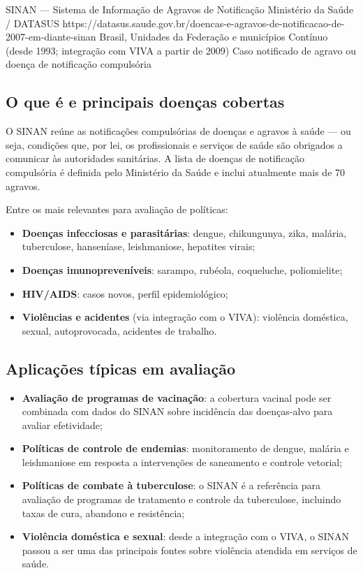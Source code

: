 \ficharapida
  {SINAN --- Sistema de Informação de Agravos de Notificação}
  {Ministério da Saúde / DATASUS}
  {https://datasus.saude.gov.br/doencas-e-agravos-de-notificacao-de-2007-em-diante-sinan}
  {Brasil, Unidades da Federação e municípios}
  {Contínuo (desde 1993; integração com VIVA a partir de 2009)}
  {Caso notificado de agravo ou doença de notificação compulsória}

\subsection{O que é e principais doenças cobertas}

O SINAN reúne as notificações compulsórias de doenças e agravos à saúde --- ou seja, condições que, por lei, os profissionais e serviços de saúde são obrigados a comunicar às autoridades sanitárias. A lista de doenças de notificação compulsória é definida pelo Ministério da Saúde e inclui atualmente mais de 70 agravos.

Entre os mais relevantes para avaliação de políticas:

\begin{itemize}
  \item \textbf{Doenças infecciosas e parasitárias}: dengue, chikungunya, zika, malária, tuberculose, hanseníase, leishmaniose, hepatites virais;
  \item \textbf{Doenças imunopreveníveis}: sarampo, rubéola, coqueluche, poliomielite;
  \item \textbf{HIV/AIDS}: casos novos, perfil epidemiológico;
  \item \textbf{Violências e acidentes} (via integração com o VIVA): violência doméstica, sexual, autoprovocada, acidentes de trabalho.
\end{itemize}

\subsection{Aplicações típicas em avaliação}

\begin{itemize}
  \item \textbf{Avaliação de programas de vacinação}: a cobertura vacinal pode ser combinada com dados do SINAN sobre incidência das doenças-alvo para avaliar efetividade;
  \item \textbf{Políticas de controle de endemias}: monitoramento de dengue, malária e leishmaniose em resposta a intervenções de saneamento e controle vetorial;
  \item \textbf{Políticas de combate à tuberculose}: o SINAN é a referência para avaliação de programas de tratamento e controle da tuberculose, incluindo taxas de cura, abandono e resistência;
  \item \textbf{Violência doméstica e sexual}: desde a integração com o VIVA, o SINAN passou a ser uma das principais fontes sobre violência atendida em serviços de saúde.
\end{itemize}

